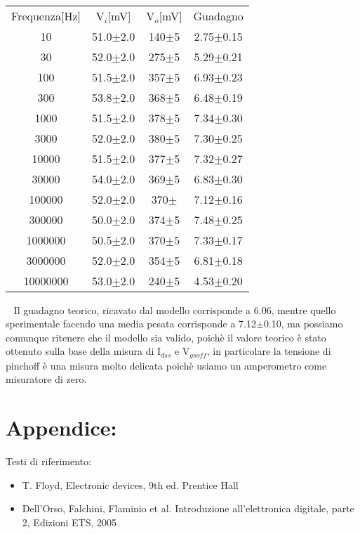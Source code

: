 \documentclass{article}
\begin{document}
~
\begin{table}[]
    \begin{center}
        \begin{tabular}{c|c|c|c}
        Frequenza[Hz]&V$_{i}$[mV]&V$_{o}$[mV]&Guadagno&\\
        10&51.0$\pm$2.0&140$\pm$5&2.75$\pm$0.15\\
        30&52.0$\pm$2.0&275$\pm$5&5.29$\pm$0.21\\
        100&51.5$\pm$2.0&357$\pm$5&6.93$\pm$0.23\\
        300&53.8$\pm$2.0&368$\pm$5&6.48$\pm$0.19\\
        1000&51.5$\pm$2.0&378$\pm$5&7.34$\pm$0.30\\
        3000&52.0$\pm$2.0&380$\pm$5&7.30$\pm$0.25\\
        10000&51.5$\pm$2.0&377$\pm$5&7.32$\pm$0.27\\
        30000&54.0$\pm$2.0&369$\pm$5&6.83$\pm$0.30\\
        100000&52.0$\pm$2.0&370$\pm$&7.12$\pm$0.16\\
        300000&50.0$\pm$2.0&374$\pm$5&7.48$\pm$0.25\\
        1000000&50.5$\pm$2.0&370$\pm$5&7.33$\pm$0.17\\
        3000000&52.0$\pm$2.0&354$\pm$5&6.81$\pm$0.18\\
        10000000&53.0$\pm$2.0&240$\pm$5&4.53$\pm$0.20\\
        \end{tabular}
   \end{center}
\end{table} 
~
Il guadagno teorico, ricavato dal modello corrisponde a 6.06, mentre quello sperimentale facendo una media pesata corrisponde a 7.12$\pm$0.10, ma possiamo comunque ritenere che il modello sia valido, poichè il valore teorico è stato ottenuto sulla base della misura di I$_{dss}$ e V$_{gsoff}$, in particolare la tensione di pinchoff è una misura molto delicata poichè usiamo un amperometro come misuratore di zero.
~
\section{Appendice:}
Testi di riferimento:
\begin{itemize}
    \item T. Floyd, Electronic devices, 9th ed. Prentice Hall
    \item Dell’Orso, Falchini, Flaminio et al. Introduzione all’elettronica digitale,
parte 2, Edizioni ETS, 2005

\end{itemize}
\end{document}
